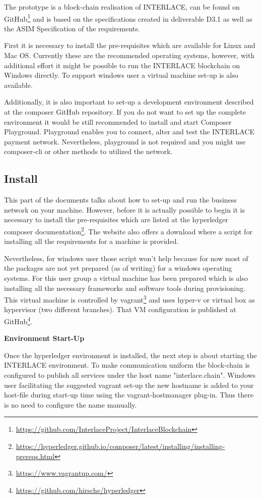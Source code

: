 The prototype is a block-chain realisation of INTERLACE, can be found on GitHub\footnote{\url{https://github.com/InterlaceProject/InterlaceBlockchain}} and is based on the specifications created in deliverable D3.1\cite{INTERLACE_D31} as well as the ASIM Specification of the requirements.

First it is necessary to install the pre-requisites which are available for Linux and Mac OS. Currently these are the recommended operating systems, however, with additional effort it might be possible to run the INTERLACE blockchain on Windows directly. To support windows user a virtual machine set-up is also available.

Additionally, it is also important to set-up a development environment described at the composer GitHub repository. If you do not want to set up the complete environment it would be still recommended to install and start Composer Playground. Playground enables you to connect, alter and test the INTERLACE payment network. Nevertheless, playground is not required and you might use composer-cli or other methods to utilized the network.

\subsection{Install}

This part of the documents talks about how to set-up and run the business network on your machine. However, before it is actually possible to begin it is necessary to install the pre-requisites which are listed at the hyperledger composer documentation\footnote{\url{https://hyperledger.github.io/composer/latest/installing/installing-prereqs.html}}. The website also offers a download where a script for installing all the requirements for a machine is provided.

Nevertheless, for windows user those script won't help because for now most of the packages are not yet prepared (as of writing) for a windows operating systems. For this user group a virtual machine has been prepared which is also installing all the necessary frameworks and software tools during provisioning. This virtual machine is controlled by vagrant\footnote{\url{https://www.vagrantup.com/}} and uses hyper-v or virtual box as hypervisor (two different branches). That VM configuration is published at GitHub\footnote{\url{https://github.com/hirsche/hyperledger}}.

\textbf{Environment Start-Up}

Once the hyperledger environment is installed, the next step is about starting the INTERLACE environment. To make communication uniform the block-chain is configured to publish all services under the host name "interlace.chain". Windows user facilitating the suggested vagrant set-up the new hostname is added to your host-file during start-up time using the vagrant-hostmanager plug-in. Thus there is no need to configure the name manually.

